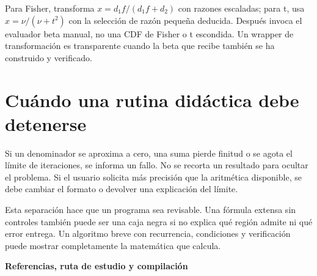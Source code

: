 \documentclass[11pt,a4paper]{article}
\theoremstyle{definition}
\newcommand{\parte}[1]{\par\bigskip\Needspace{8\baselineskip}\begin{center}{\Large\bfseries\color{azul}#1}\end{center}}
\newcounter{problema}
\begin{document}
Para Fisher, transforma $x=d_1f/(d_1f+d_2)$ con razones escaladas; para t, usa $x=\nu/(\nu+t^2)$ con la selección de razón pequeña deducida. Después invoca el evaluador beta manual, no una CDF de Fisher o t escondida. Un wrapper de transformación es transparente cuando la beta que recibe también se ha construido y verificado.

\section{Cuándo una rutina didáctica debe detenerse}
Si un denominador se aproxima a cero, una suma pierde finitud o se agota el límite de iteraciones, se informa un fallo. No se recorta un resultado para ocultar el problema. Si el usuario solicita más precisión que la aritmética disponible, se debe cambiar el formato o devolver una explicación del límite.

Esta separación hace que un programa sea revisable. Una fórmula extensa sin controles también puede ser una caja negra si no explica qué región admite ni qué error entrega. Un algoritmo breve con recurrencia, condiciones y verificación puede mostrar completamente la matemática que calcula.



\parte{Referencias, ruta de estudio y compilación}
\end{document}
